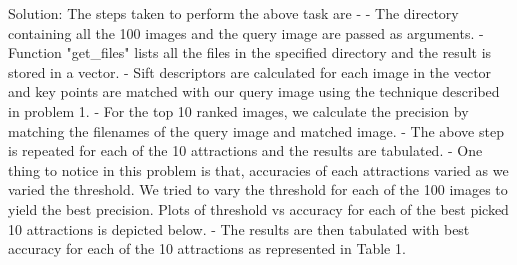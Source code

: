 \documentclass{article}
\begin{document}
\begin{enumerate}
		Solution: The steps taken to perform the above task are - \newline
		- The directory containing all the 100 images and the query image are passed as arguments. \newline
		- Function "get\_files" lists all the files in the specified directory and the result is stored in a vector. \newline
		- Sift descriptors are calculated for each image in the vector and key points are matched with our query image using the technique described in problem 1. \newline
		- For the top 10 ranked images, we calculate the precision by matching the filenames of the query image and matched image. \newline
		- The above step is repeated for each of the 10 attractions and the results are tabulated. \newline
		- One thing to notice in this problem is that, accuracies of each attractions varied as we varied the threshold. We tried to vary the threshold for each of the 100 images to yield the best precision. Plots of threshold vs accuracy for each of the best picked 10 attractions is depicted below. \newline
		- The results are then tabulated with best accuracy for each of the 10 attractions as represented in Table 1. \newline
 

\end{enumerate}
\end{document}
